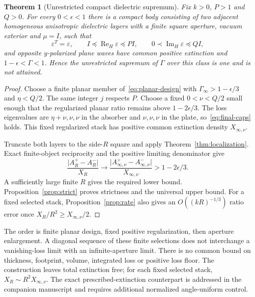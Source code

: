 \documentclass[11pt,a4paper]{article}
\newtheorem{theorem}{Theorem}[section]
\theoremstyle{remark}
\newcommand{\abs}[1]{\lvert #1\rvert}
\newcommand{\ReH}{\operatorname{Re}_{H}}
\newcommand{\ImH}{\operatorname{Im}_{H}}
\begin{document}
\begin{theorem}[Unrestricted compact dielectric supremum]\label{thm:supremum}
Fix $k>0$, $P>1$ and $Q>0$. For every $0<\epsilon<1$ there is a compact body consisting of two adjacent homogeneous anisotropic dielectric layers with a finite square aperture, vacuum exterior and $\mu=I$, such that
\begin{equation}\label{eq:final-caps}
 \varepsilon^T=\varepsilon,\qquad I\preceq\ReH\varepsilon\preceq PI,\qquad
 0\prec\ImH\varepsilon\preceq QI,
\end{equation}
and opposite $y$-polarized plane waves have common positive extinction and $1-\epsilon<\Gamma<1$. Hence the unrestricted supremum of $\Gamma$ over this class is one and is not attained.
\end{theorem}
\begin{proof}
Choose a finite planar member of~\eqref{eq:planar-design} with $\Gamma_\infty>1-\epsilon/3$ and $\eta<Q/2$. The same integer $j$ respects $P$. Choose a fixed $0<\nu<Q/2$ small enough that the regularized planar ratio remains above $1-2\epsilon/3$. The loss eigenvalues are $\eta+\nu,\nu,\nu$ in the absorber and $\nu,\nu,\nu$ in the plate, so~\eqref{eq:final-caps} holds. This fixed regularized stack has positive common extinction density $X_{\infty,\nu}$.

Truncate both layers to the side-$R$ square and apply Theorem~\ref{thm:localization}. Exact finite-object reciprocity and the positive limiting denominator give
\[
 \frac{\abs{A_R^+-A_R^-}}{X_R}\longrightarrow
 \frac{\abs{A_{\infty,\nu}^+-A_{\infty,\nu}^-}}{X_{\infty,\nu}}>1-2\epsilon/3.
\]
A sufficiently large finite $R$ gives the required lower bound. Proposition~\ref{prop:strict} proves strictness and the universal upper bound. For a fixed selected stack, Proposition~\ref{prop:rate} also gives an $O((kR)^{-1/3})$ ratio error once $X_R/R^2\geq X_{\infty,\nu}/2$.
\end{proof}
The order is finite planar design, fixed positive regularization, then aperture enlargement. A diagonal sequence of these finite selections does not interchange a vanishing-loss limit with an infinite-aperture limit. There is no common bound on thickness, footprint, volume, integrated loss or positive loss floor. The construction leaves total extinction free; for each fixed selected stack, $X_R\sim R^2X_{\infty,\nu}$. The exact prescribed-extinction counterpart is addressed in the companion manuscript \citep{WangZhengPrescribed2026} and requires additional normalized angle-uniform control.
\end{document}
